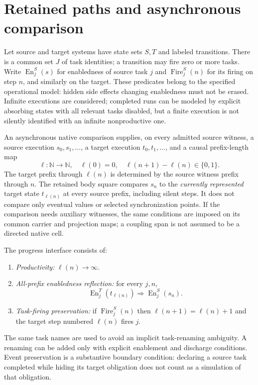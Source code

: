 \documentclass[11pt]{article}
\begin{document}
\section{Retained paths and asynchronous comparison}
Let source and target systems have state sets $S,T$ and labeled transitions. There is a common set $J$ of task identities; a transition may fire zero or more tasks. Write $\operatorname{En}^S_j(s)$ for enabledness of source task $j$ and $\operatorname{Fire}^S_j(n)$ for its firing on step $n$, and similarly on the target. These predicates belong to the specified operational model: hidden side effects changing enabledness must not be erased. Infinite executions are considered; completed runs can be modeled by explicit absorbing states with all relevant tasks disabled, but a finite execution is not silently identified with an infinite nonproductive one.

An asynchronous native comparison supplies, on every admitted source witness, a source execution $s_0,s_1,\ldots$, a target execution $t_0,t_1,\ldots$, and a causal prefix-length map
\[
 \ell:\mathbb N\to\mathbb N,\quad\ell(0)=0,\quad
 \ell(n+1)-\ell(n)\in\{0,1\}.
\]
The target prefix through $\ell(n)$ is determined by the source witness prefix through $n$. The retained body square compares $s_n$ to the \emph{currently represented} target state $t_{\ell(n)}$ at every source prefix, including silent steps. It does not compare only eventual values or selected synchronization points. If the comparison needs auxiliary witnesses, the same conditions are imposed on its common carrier and projection maps; a coupling span is not assumed to be a directed native cell.

The progress interface consists of:
\begin{enumerate}
\item \emph{Productivity:} $\ell(n)\to\infty$.
\item \emph{All-prefix enabledness reflection:} for every $j,n$,
\[
 \operatorname{En}^T_j(t_{\ell(n)})\Longrightarrow\operatorname{En}^S_j(s_n).
\]
\item \emph{Task-firing preservation:} if $\operatorname{Fire}^S_j(n)$ then $\ell(n+1)=\ell(n)+1$ and the target step numbered $\ell(n)$ fires $j$.
\end{enumerate}
The same task names are used to avoid an implicit task-renaming ambiguity. A renaming can be added only with explicit enablement and discharge conditions. Event preservation is a substantive boundary condition: declaring a source task completed while hiding its target obligation does not count as a simulation of that obligation.
\end{document}

